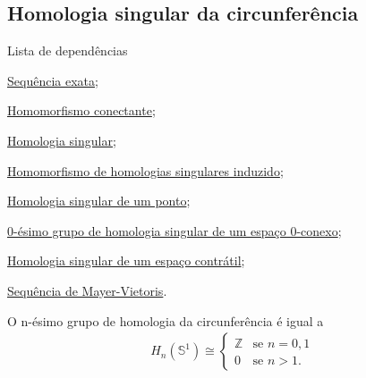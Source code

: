\subsection{Homologia singular da circunferência} %
\label{homologia-singular-de-S1-prop}
\begin{titlemize}{Lista de dependências}
    \item \hyperref[sequencia-exata-def]{Sequência exata};\\
    \item \hyperref[homomorfismo-conectante-def]{Homomorfismo conectante};\\
    \item \hyperref[homologia-singular-def]{Homologia singular};\\
    \item \hyperref[homomorfismo-de-homologias-singulares-induzido-prop]{Homomorfismo de homologias singulares induzido};\\
    \item \hyperref[homologia-singular-de-um-ponto-prop]{Homologia singular de um ponto};\\
    \item \hyperref[0-esimo-grupo-de-homologia-de-espaco-zero-conexo-prop]{0-ésimo grupo de homologia singular de um espaço 0-conexo};\\
    \item \hyperref[homologia-singular-de-um-espaco-contratil-prop]{Homologia singular de um espaço contrátil};\\
    \item \hyperref[sequencia-de-mayer-vietoris-prop]{Sequência de Mayer-Vietoris}.

    
    
\end{titlemize}

\begin{prop}
    O n-ésimo grupo de homologia da circunferência é igual a 
    \begin{align*}
        H_n(\mathbb{S}^1)\cong\begin{cases}
            \mathbb{Z}&\text{se }n=0,1\\
            0&\text{se }n>1.
        \end{cases}
    \end{align*}
\end{prop}

